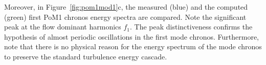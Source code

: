 Moreover, in Figure~\ref{fig:pom1mod1}{c}, the measured (blue) and the computed (green) first PoM1 chronos energy spectra are compared. Note the significant peak at the flow dominant {harmonics} $f_1$. The peak distinctiveness confirms the hypothesis of almost periodic oscillations in the first mode chronos.  Furthermore, note that there is no physical reason for the energy spectrum of the mode chronos to preserve the standard turbulence energy cascade. 


